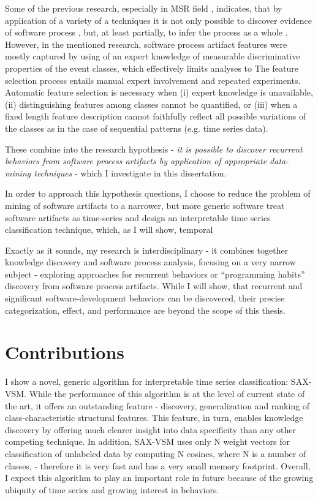 Some of the previous research, especially in MSR field  \cite{citeulike:9114115, citeulike:7853299}, 
indicates, that by application of a variety of a techniques it is not only possible to discover evidence of 
software process \cite{citeulike:9007622}, but, at least partially, to infer the process as a 
whole \cite{citeulike:5128808}. However, in the mentioned research, software process artifact features 
were mostly captured by using of an expert knowledge of measurable discriminative properties of the 
event classes, which effectively limits analyses to The feature selection
process entails manual expert involvement and repeated experiments. Automatic feature
selection is necessary when (i) expert knowledge is unavailable, (ii) distinguishing features
among classes cannot be quantified, or (iii) when a fixed length feature description cannot
faithfully reflect all possible variations of the classes as in the case of sequential patterns
(e.g. time series data).

These combine into the research hypothesis - \textit{it is possible to discover recurrent behaviors 
from software process artifacts by application of appropriate data-mining techniques} - 
which I investigate in this dissertation. 

In order to approach this hypothesis questions, I choose to reduce the problem of mining of software artifacts to a narrower,
but more generic software treat software artifacts as time-series and design an interpretable time 
series classification technique, which, 
as I will show, temporal 


Exactly as it sounds, my research is interdisciplinary - it combines together knowledge discovery and software process 
analysis, focusing on a very narrow subject - exploring approaches for recurrent behaviors or ``programming habits'' 
discovery from software process artifacts.
While I will show, that recurrent and significant software-development behaviors can be discovered,
their precise categorization, effect, and performance are beyond the scope of this thesis.

\section{Contributions}
I show a novel, generic algorithm for interpretable time series classification: SAX-VSM. 
While the performance of this algorithm is at the level of current state of the art, it offers an outstanding feature -
discovery, generalization and ranking of class-characteristic structural features. This feature, in turn, enables
knowledge discovery by offering much clearer insight into data specificity than any other competing technique.
In addition, SAX-VSM uses only N weight vectors for classification of unlabeled data by computing N cosines, where N is
a number of classes, - therefore it is very fast and has a very small memory footprint.
Overall, I expect this algorithm to play an important role in future because of the growing ubiquity of time series and
growing interest in behaviors.

